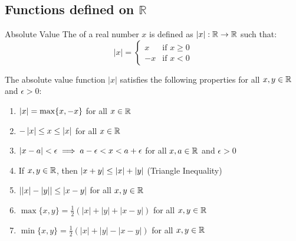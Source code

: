 \documentclass[openany]{book}
\begin{document}
\subsection{Functions defined on $\mathbb{R}$}
\begin{mydefinition}{Absolute Value}
    The  of a real number $x$ is defined as $|x|: \mathbb{R} \rightarrow \mathbb{R}$ such that:
    $$|x| = 
    \begin{cases}
        x & \text{if } x \geq 0 \\
        -x & \text{if } x < 0
    \end{cases}$$
\end{mydefinition}
\begin{mytheorem} The absolute value function $|x|$ satisfies the following properties for all $x, y \in \mathbb{R}$ and $\epsilon > 0$:
    \begin{enumerate}
        \item $\left| x \right| = \max\{x, -x\}$ for all $x \in \mathbb{R}$
        \item $-\left| x \right| \leq x \leq \left| x \right|$ for all $x \in \mathbb{R}$
        \item $\left| x - a \right| < \epsilon \implies a - \epsilon < x < a + \epsilon$ for all $x, a \in \mathbb{R}$ and $\epsilon > 0$
        \item If $x, y \in \mathbb{R}$, then $\left| x + y \right| \leq \left| x \right| + \left| y \right|$ (Triangle Inequality)
        \item $\left| \left| x \right| - \left| y \right| \right| \leq \left| x - y \right|$ for all $x, y \in \mathbb{R}$
        \item $\max\{x, y\} = \frac{1}{2}(|x| + |y| + |x - y|)$ for all $x, y \in \mathbb{R}$
        \item $\min\{x, y\} = \frac{1}{2}(|x| + |y| - |x - y|)$ for all $x, y \in \mathbb{R}$
    \end{enumerate}
\end{mytheorem}
\end{document}

